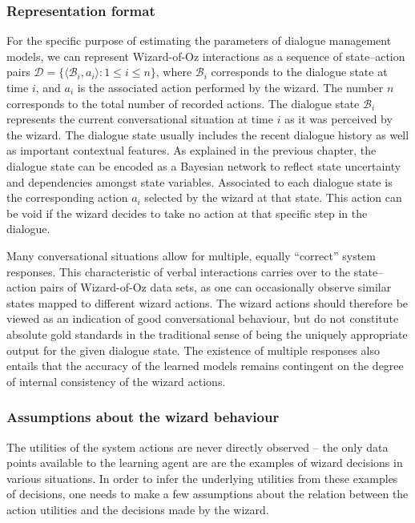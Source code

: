 \subsubsection*{Representation format}

For the specific purpose of estimating the parameters of dialogue management models, we can represent Wizard-of-Oz interactions as a sequence of state--action pairs $\mathcal{D} = \{\langle \mathcal{B}_i, a_i \rangle : 1 \leq i \leq n\}$, where $\mathcal{B}_i$ corresponds to the dialogue state at time $i$, and $a_i$ is the associated action performed by the wizard.  The number $n$ corresponds to the total number of recorded actions. 
The dialogue state $\mathcal{B}_i$ represents the current conversational situation at time $i$ as it was perceived by the wizard.  The dialogue state usually includes the recent dialogue history as well as important contextual features.  As explained in the previous chapter, the dialogue state can be encoded as a Bayesian network to reflect state uncertainty and dependencies amongst state variables. Associated to each dialogue state is the corresponding action $a_i$ selected by the wizard at that state. This action can be void if the wizard decides to take no action at that specific step in the dialogue. 


Many conversational situations allow for multiple, equally ``correct'' system responses.  This characteristic of verbal interactions carries over to the state--action pairs of Wizard-of-Oz data sets, as one can occasionally observe similar states mapped to different wizard actions. The wizard actions should therefore be viewed as an indication of good conversational behaviour, but do not constitute absolute gold standards in the traditional sense of being the uniquely appropriate output for the given dialogue state. The existence of multiple responses also entails that the accuracy of the learned models remains contingent on the degree of internal consistency of the wizard actions. 

\subsubsection*{Assumptions about the wizard behaviour}

The utilities of the system actions are never directly observed -- the only data points available to the learning agent are are the examples of wizard decisions in various situations.  In order to infer the underlying utilities from these examples of decisions, one needs to make a few assumptions about the relation between the action utilities and the decisions made by the wizard. 

